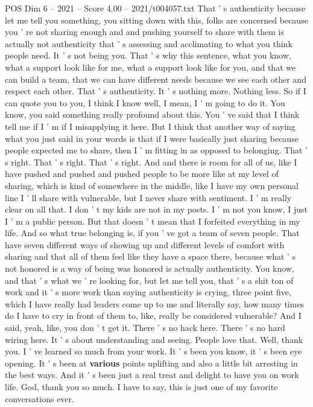 \begin{textsample}{POS Dim 6 – 2021 – Score 4.00 – 2021/t004057.txt}
That ' s authenticity because let me tell you something, you sitting down with this, folks are concerned because you ' re not sharing enough and and pushing yourself to share with them is actually not authenticity that ' s assessing and acclimating to what you think people need.
It ' s not being you.
That ' s why this sentence, what you know, what a support look like for me, what a support look like for you, and that we can build a team, that we can have different needs because we see each other and respect each other.
That ' s authenticity.
It ' s nothing more.
Nothing less.
So if I can quote you to you, I think I know well, I mean, I ' m going to do it.
You know, you said something really profound about this.
You ' ve said that I think tell me if I ' m if I misapplying it here.
But I think that another way of saying what you just said in your words is that if I were basically just sharing because people expected me to share, then I ' m fitting in as opposed to belonging.
That ' s right.
That ' s right.
That ' s right.
And and there is room for all of us, like I have pushed and pushed and pushed people to be more like at my level of sharing, which is kind of somewhere in the middle, like I have my own personal line I ' ll share with vulnerable, but I never share with sentiment.
I ' m really clear on all that.
I don ' t my kids are not in my posts.
I ' m not you know, I just I ' m a public person.
But that doesn ' t mean that I forfeited everything in my life.
And so what true belonging is, if you ' ve got a team of seven people.
That have seven different ways of showing up and different levels of comfort with sharing and that all of them feel like they have a space there, because what ' s not honored is a way of being was honored is actually authenticity.
You know, and that ' s what we ' re looking for, but let me tell you, that ' s a shit ton of work and it ' s more work than saying authenticity is crying, three point five, which I have really had leaders come up to me and literally say, how many times do I have to cry in front of them to, like, really be considered vulnerable?
And I said, yeah, like, you don ' t get it.
There ' s no hack here.
There ' s no hard wiring here.
It ' s about understanding and seeing.
People love that.
Well, thank you.
I ' ve learned so much from your work.
It ' s been you know, it ' s been eye opening.
It ' s been at \textbf{various} points uplifting and also a little bit arresting in the best ways.
And it ' s been just a real treat and delight to have you on work life.
God, thank you so much.
I have to say, this is just one of my favorite conversations ever.

\end{textsample}
